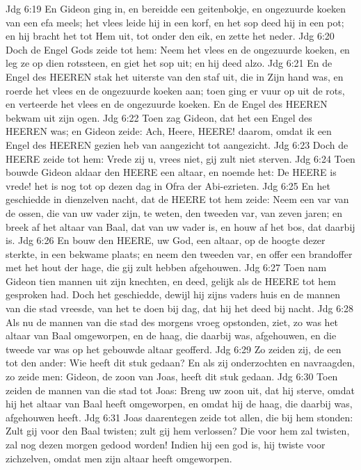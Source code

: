 Jdg 6:19  En Gideon ging in, en bereidde een geitenbokje, en ongezuurde koeken van een efa meels; het vlees leide hij in een korf, en het sop deed hij in een pot; en hij bracht het tot Hem uit, tot onder den eik, en zette het neder.
Jdg 6:20  Doch de Engel Gods zeide tot hem: Neem het vlees en de ongezuurde koeken, en leg ze op dien rotssteen, en giet het sop uit; en hij deed alzo.
Jdg 6:21  En de Engel des HEEREN stak het uiterste van den staf uit, die in Zijn hand was, en roerde het vlees en de ongezuurde koeken aan; toen ging er vuur op uit de rots, en verteerde het vlees en de ongezuurde koeken. En de Engel des HEEREN bekwam uit zijn ogen.
Jdg 6:22  Toen zag Gideon, dat het een Engel des HEEREN was; en Gideon zeide: Ach, Heere, HEERE! daarom, omdat ik een Engel des HEEREN gezien heb van aangezicht tot aangezicht.
Jdg 6:23  Doch de HEERE zeide tot hem: Vrede zij u, vrees niet, gij zult niet sterven.
Jdg 6:24  Toen bouwde Gideon aldaar den HEERE een altaar, en noemde het: De HEERE is vrede! het is nog tot op dezen dag in Ofra der Abi-ezrieten.
Jdg 6:25  En het geschiedde in dienzelven nacht, dat de HEERE tot hem zeide: Neem een var van de ossen, die van uw vader zijn, te weten, den tweeden var, van zeven jaren; en breek af het altaar van Baal, dat van uw vader is, en houw af het bos, dat daarbij is.
Jdg 6:26  En bouw den HEERE, uw God, een altaar, op de hoogte dezer sterkte, in een bekwame plaats; en neem den tweeden var, en offer een brandoffer met het hout der hage, die gij zult hebben afgehouwen.
Jdg 6:27  Toen nam Gideon tien mannen uit zijn knechten, en deed, gelijk als de HEERE tot hem gesproken had. Doch het geschiedde, dewijl hij zijns vaders huis en de mannen van die stad vreesde, van het te doen bij dag, dat hij het deed bij nacht.
Jdg 6:28  Als nu de mannen van die stad des morgens vroeg opstonden, ziet, zo was het altaar van Baal omgeworpen, en de haag, die daarbij was, afgehouwen, en die tweede var was op het gebouwde altaar geofferd.
Jdg 6:29  Zo zeiden zij, de een tot den ander: Wie heeft dit stuk gedaan? En als zij onderzochten en navraagden, zo zeide men: Gideon, de zoon van Joas, heeft dit stuk gedaan.
Jdg 6:30  Toen zeiden de mannen van die stad tot Joas: Breng uw zoon uit, dat hij sterve, omdat hij het altaar van Baal heeft omgeworpen, en omdat hij de haag, die daarbij was, afgehouwen heeft.
Jdg 6:31  Joas daarentegen zeide tot allen, die bij hem stonden: Zult gij voor den Baal twisten; zult gij hem verlossen? Die voor hem zal twisten, zal nog dezen morgen gedood worden! Indien hij een god is, hij twiste voor zichzelven, omdat men zijn altaar heeft omgeworpen.
